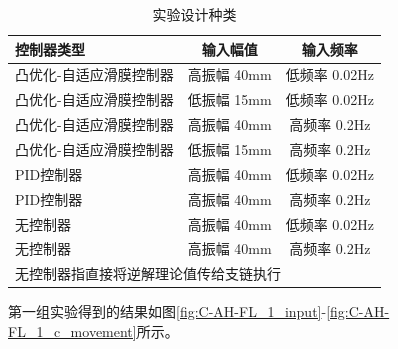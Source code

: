 \begin{table}[H]
    \small
    \centering
    \caption{实验设计种类}
    \begin{tabular}{lcc}
    \toprule
    控制器类型 & 输入幅值       & 输入频率         \\
    \midrule
    凸优化-自适应滑膜控制器      & 高振幅 40mm &  低频率 0.02Hz \\
    凸优化-自适应滑膜控制器      & 低振幅 15mm &  低频率 0.02Hz \\
    凸优化-自适应滑膜控制器      & 高振幅 40mm &  高频率 0.2Hz \\
    凸优化-自适应滑膜控制器      & 低振幅 15mm &  高频率 0.2Hz \\
    PID控制器      & 高振幅 40mm &  低频率 0.02Hz \\
    PID控制器      & 高振幅 40mm &  高频率 0.2Hz \\
    无控制器      & 高振幅 40mm &  低频率 0.02Hz \\
    无控制器      & 高振幅 40mm &  高频率 0.2Hz \\
    \bottomrule
    \multicolumn{3}{l}{\scriptsize 无控制器指直接将逆解理论值传给支链执行} \\
    \end{tabular}%
    \label{tab:experiment}%
\end{table}%

第一组实验得到的结果如图\ref{fig:C-AH-FL_1_input}-\ref{fig:C-AH-FL_1_c_movement}所示。

